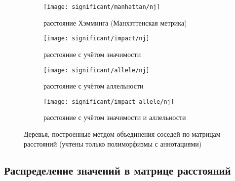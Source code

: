 \documentclass[main.tex]{subfiles}
\begin{document}
\begin{figure}[H]
    \centering
    \begin{subfigure}{.5\textwidth}
        \centering
        \texttt{[image: significant/manhattan/nj]}
        \captionsetup{width=.8\linewidth}
        \caption{расстояние Хэмминга (Манхэттенская метрика)}
        \label{fig:nj_manh}
    \end{subfigure}%
    \begin{subfigure}{.5\textwidth}
        \centering
        \texttt{[image: significant/impact/nj]}
        \captionsetup{width=.8\linewidth}
        \caption{расстояние с учётом значимости}
        \label{fig:nj_impact}
    \end{subfigure}

    \begin{subfigure}{.5\textwidth}
        \centering
        \texttt{[image: significant/allele/nj]}
        \captionsetup{width=.8\linewidth}
        \caption{расстояние с учётом аллельности}
        \label{fig:nj_allele}
    \end{subfigure}%
    \begin{subfigure}{.5\textwidth}
        \centering
        \texttt{[image: significant/impact\_allele/nj]}
        \captionsetup{width=.8\linewidth}
        \caption{расстояние с учётом значимости и аллельности}
        \label{fig:nj_impact_allele}
    \end{subfigure}
    \caption{Деревья, построенные метдом объединения соседей по матрицам расстояний (учтены только полиморфизмы с аннотациями)}
\end{figure}

\subsection{Распределение значений в матрице расстояний}
\end{document}
